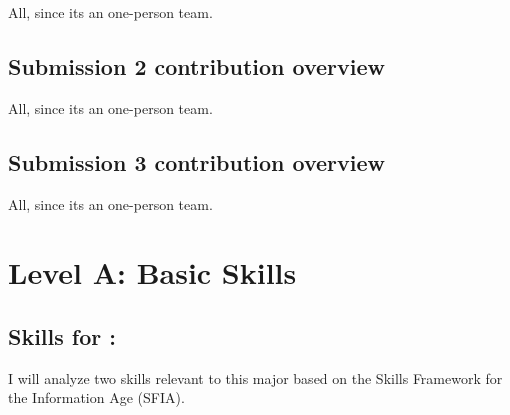 \documentclass[a4paper, 11pt]{report}
\begin{document}
All, since its an one-person team.

\subsection{Submission 2 contribution overview}

All, since its an one-person team.

\subsection{Submission 3 contribution overview}

All, since its an one-person team.



\newpage
\section{Level A: Basic Skills}

\subsection{Skills for \majA: \studA}


I will analyze two skills relevant to this major based on the Skills Framework for the Information Age (SFIA).
\end{document}
